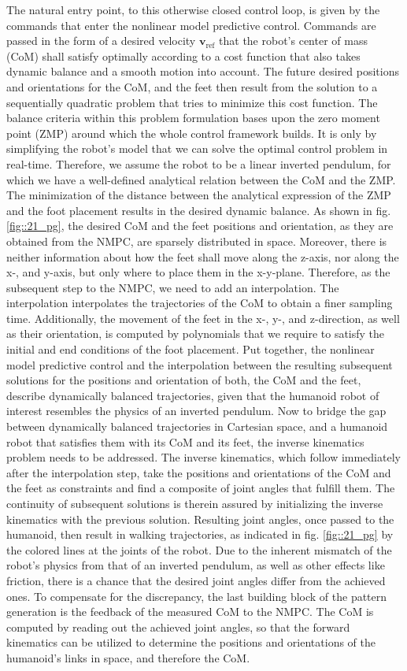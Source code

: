 The natural entry point, to this otherwise closed control loop, is given by the commands that enter the nonlinear model predictive control. Commands are passed in the form of a desired velocity $\mathbf{v}_\text{ref}$ that the robot's center of mass (CoM) shall satisfy optimally according to a cost function that also takes dynamic balance and a smooth motion into account. The future desired positions and orientations for the CoM, and the feet then result from the solution to a sequentially quadratic problem that tries to minimize this cost function. The balance criteria within this problem formulation bases upon the zero moment point (ZMP) around which the whole control framework builds. It is only by simplifying the robot's model that we can solve the optimal control problem in real-time. Therefore, we assume the robot to be a linear inverted pendulum, for which we have a well-defined analytical relation between the CoM and the ZMP. The minimization of the distance between the analytical expression of the ZMP and the foot placement results in the desired dynamic balance. As shown in fig. \ref{fig::21_pg}, the desired CoM and the feet positions and orientation, as they are obtained from the NMPC, are sparsely distributed in space. Moreover, there is neither information about how the feet shall move along the z-axis, nor along the x-, and y-axis, but only where to place them in the x-y-plane. Therefore, as the subsequent step to the NMPC, we need to add an interpolation. The interpolation interpolates the trajectories of the CoM to obtain a finer sampling time. Additionally, the movement of the feet in the x-, y-, and z-direction, as well as their orientation, is computed by polynomials that we require to satisfy the initial and end conditions of the foot placement. Put together, the nonlinear model predictive control and the interpolation between the resulting subsequent solutions for the positions and orientation of both, the CoM and the feet, describe dynamically balanced trajectories, given that the humanoid robot of interest resembles the physics of an inverted pendulum. Now to bridge the gap between dynamically balanced trajectories in Cartesian space, and a humanoid robot that satisfies them with its CoM and its feet, the inverse kinematics problem needs to be addressed. The inverse kinematics, which follow immediately after the interpolation step, take the positions and orientations of the CoM and the feet as constraints and find a composite of joint angles that fulfill them. The continuity of subsequent solutions is therein assured by initializing the inverse kinematics with the previous solution. Resulting joint angles, once passed to the humanoid, then result in walking trajectories, as indicated in fig. \ref{fig::21_pg} by the colored lines at the joints of the robot. Due to the inherent mismatch of the robot's physics from that of an inverted pendulum, as well as other effects like friction, there is a chance that the desired joint angles differ from the achieved ones. To compensate for the discrepancy, the last building block of the pattern generation is the feedback of the measured CoM to the NMPC. The CoM is computed by reading out the achieved joint angles, so that the forward kinematics can be utilized to determine the positions and orientations of the humanoid's links in space, and therefore the CoM.
